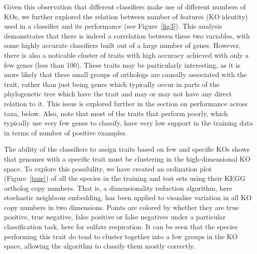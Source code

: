 \documentclass[10pt,letterpaper]{article}
\begin{document}
Given this observation that different classifiers make use of different numbers of KOs, we further explored the relation between number of features (KO identity) used in a classifier and its performance (see Figure~\ref{fig3}). This analysis demonstrates that there is indeed a correlation between these two variables, with some highly accurate classifiers built out of a large number of genes. However, there is also a noticable cluster of traits with high accuracy achieved with only a few genes (less than 100). These traits may be particularly interesting, as it is more likely that these small groups of orthologs are causally associated with the trait, rather than just being genes which typically occur in parts of the phylogenetic tree which have the trait and may or may not have any direct relation to it. This issue is explored further in the section on performance across taxa, below. Also, note that most of the traits that perform poorly, which typically use very few genes to classify, have very low support in the training data in terms of number of positive examples.

The ability of the classifiers to assign traits based on few and specific KOs shows that genomes with a specific trait must be clustering in the high-dimensional KO space. To explore this possibility, we have created an ordination plot (Figure~\ref{tsne}) of all the species in the training and test sets using their KEGG ortholog copy numbers. That is, a dimensionality reduction algorithm, here stochastic neighbour embedding, has been applied to visualise variation in all KO copy numbers in two dimensions. Points are colored by whether they are true positive, true negative, false positive or false negatives under a particular classification task, here for sulfate respiration. It can be seen that the species performing this trait do tend to cluster together into a few groups in the KO space, allowing the algorithm to classify them mostly correctly. 
\end{document}
